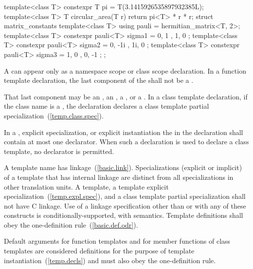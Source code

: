\begin{example}
\begin{codeblock}
template<class T>
  constexpr T pi = T(3.1415926535897932385L);
template<class T>
T circular_area(T r) {
  return pi<T> * r * r;
}
struct matrix_constants {
  template<class T>
   using pauli = hermitian_matrix<T, 2>;
  template<class T>
   constexpr pauli<T> sigma1 = { { 0, 1 }, { 1, 0 } };
  template<class T>
   constexpr pauli<T> sigma2 = { { 0, -1i }, { 1i, 0 } };
  template<class T>
   constexpr pauli<T> sigma3 = { { 1, 0 }, { 0, -1 } };
};
\end{codeblock}
\end{example}

\pnum
A
can appear only as a namespace scope or class scope declaration.
In a function template declaration, the last component of the
shall not be a
.
\begin{note}
That last component may be an , an ,
a , or a . In
a class template declaration, if the
class name
is a
,
the declaration declares a class template partial specialization~(\ref{temp.class.spec}).
\end{note}

\pnum
In a
,
explicit specialization, or explicit instantiation the
in the declaration shall contain at most one declarator.
When such a declaration is used to declare a class template,
no declarator is permitted.

\pnum
{}%
A template name has linkage~(\ref{basic.link}).
Specializations (explicit or implicit) of
a template that has internal linkage are
distinct from all specializations in other translation
units.
A template, a template explicit specialization~(\ref{temp.expl.spec}), and a class
template partial specialization shall not have C linkage. Use of a linkage specification
other than  or  with any of these constructs is
conditionally-supported, with
 semantics.
Template definitions shall obey the one-definition rule~(\ref{basic.def.odr}).
\begin{note}
Default arguments for function templates and for member functions of
class templates are considered definitions for the purpose of template
instantiation~(\ref{temp.decls}) and must also obey the one-definition rule.
\end{note}

